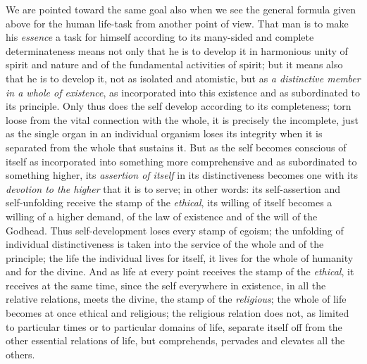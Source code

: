 \documentclass[12pt,a4paper,openany]{book}
\newcommand{\opage}[1]{\marginnote{\footnotesize\textit{[#1]}}}
\begin{document}
We are pointed toward the same goal also when we see
the general formula given above for the human life-task
from another point of view. That man is to make
his \emph{essence} a task for himself according to its many-sided and complete
determinateness means not only that he is to develop it
in harmonious unity of spirit and nature and of the fundamental activities of spirit;
but it means also that he is to develop
it, not as isolated and atomistic, but as \emph{a distinctive
member in a whole of existence}, as incorporated into
this existence and as subordinated to its principle.
Only thus does the self develop according to its completeness;
torn loose from the vital connection with the whole, it is
precisely the incomplete, just as the single organ in an
individual organism loses its integrity when it is separated
from the whole that sustains it. But as the self becomes
conscious of itself as incorporated into something more comprehensive and as subordinated
to something higher, its \emph{assertion of itself} in
\opage{504}its distinctiveness becomes one with its \emph{devotion to the
higher} that it is to serve; in other words: its self-assertion
and self-unfolding receive the stamp of the \emph{ethical}, its willing
of itself becomes a willing of a higher demand, of the law of existence
and of the will of the Godhead. Thus self-development
loses every stamp of egoism; the unfolding of
individual distinctiveness is taken into the service of the whole and of
the principle; the life the individual lives for itself, it lives
for the whole of humanity and for the divine.
And as life at every point receives the stamp of the \emph{ethical},
it receives at the same time, since the self everywhere in existence, in all the
relative relations, meets the divine, the stamp of the \emph{religious};
the whole of life becomes at once ethical and religious;
the religious relation does not, as limited to particular
times or to particular domains of life, separate itself off from the other
essential relations of life, but comprehends, pervades and
elevates all the others.
\end{document}
